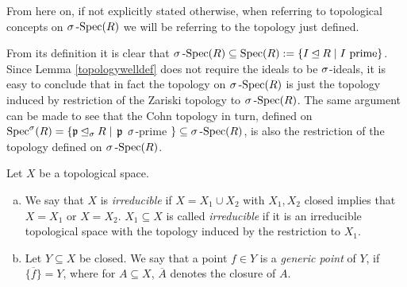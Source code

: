 From here on, if not explicitly stated otherwise, when referring to topological concepts on $\sigma\operatorname{-Spec}(R)$ we will be referring to the topology just defined.

\begin{rem}
From its definition it is clear that $\sigma\operatorname{-Spec}(R) \subseteq \operatorname{Spec}(R):= \{ I \unlhd R \mid I \text{ prime} \}$. Since Lemma \ref{topologywelldef} does not require the ideals to be $\sigma$-ideals, 
it is easy to conclude that in fact the topology on $\sigma\operatorname{-Spec}(R)$ is just the topology induced by restriction of the Zariski topology to $\sigma\operatorname{-Spec}(R)$. The same argument can be made to see that the Cohn topology in turn,
defined on $\operatorname{Spec}^\sigma(R) = \{ \mathfrak{p} \unlhd_{\sigma} R \mid $ $\mathfrak{p}$ $ \sigma$-prime $\} \subseteq \sigma\operatorname{-Spec}(R)$, is also the restriction of the topology defined on $\sigma\operatorname{-Spec}(R)$. 
\end{rem}

\begin{defn}
Let $X$ be a topological space.
\begin{enumerate}[(a)]
\item  We say that $X$ is \emph{irreducible} if $X = X_1 \cup X_2$ with $X_1, X_2$ closed implies that $X = X_1$ or $X = X_2$. 
$X_1 \subseteq X$ is called \emph{irreducible} if it is an irreducible topological space with the topology induced by the restriction to $X_1$.
\item Let $Y \subseteq X$ be closed. We say that a point $f \in Y$ is a \emph{generic point} of $Y$, if $\overline{\{  f \} } = Y$, where for $A \subseteq X$, $\overline{A}$ denotes the closure of $A$. 
\end{enumerate}
\end{defn}

